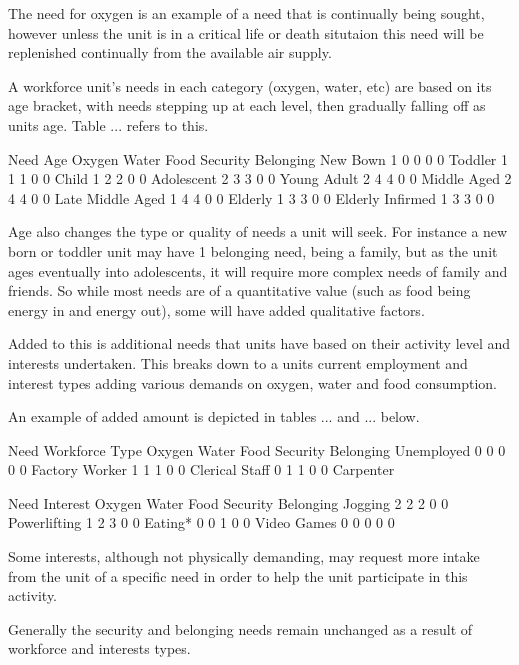 The need for oxygen is an example of a need that is continually being sought, however unless the unit is in a critical life or death situtaion this need will be replenished continually from the available air supply.

A workforce unit's needs in each category (oxygen, water, etc) are based on its age bracket, with needs stepping up at each level, then gradually falling off as units age. Table ... refers to this.

			Need	
Age			Oxygen	Water	Food	Security	Belonging
New Bown		1	0	0	0		0
Toddler			1	1	1	0		0
Child			1	2	2	0		0
Adolescent		2	3	3	0		0
Young Adult		2	4	4	0		0
Middle Aged		2	4	4	0		0
Late Middle Aged	1	4	4	0		0
Elderly			1	3	3	0		0
Elderly Infirmed	1	3	3	0		0


Age also changes the type or quality of needs a unit will seek. For instance a new born or toddler unit may have 1 belonging need, being a family, but as the unit ages eventually into adolescents, it will require more complex needs of family and friends. So while most needs are of a quantitative value (such as food being energy in and energy out), some will have added qualitative factors. 


Added to this is additional needs that units have based on their activity level and interests undertaken. This breaks down to a units current employment and interest types adding various demands on oxygen, water and food consumption.

An example of added amount is depicted in tables ... and ... below.

		Need
Workforce Type	Oxygen	Water	Food	Security	Belonging		
Unemployed	0	0	0	0		0
Factory Worker	1	1	1	0		0
Clerical Staff	0	1	1	0		0
Carpenter

	Need
Interest	Oxygen	Water	Food	Security	Belonging
Jogging	2	2	2	0	0
Powerlifting	1	2	3	0	0
Eating*	0	0	1	0	0
Video Games	0	0	0	0	0	


Some interests, although not physically demanding, may request more intake from the unit of a specific need in order to help the unit participate in this activity.

Generally the security and belonging needs remain unchanged as a result of workforce and interests types.


